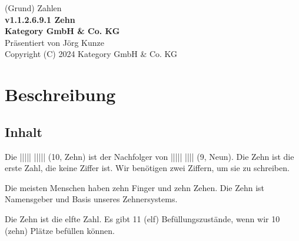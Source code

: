 \documentclass[a4paper]{amsart}
\theoremstyle{definition}
\begin{document}
\begin{titlepage}
\centering
{\huge
(Grund) Zahlen\\[1cm]
\textbf{v1.1.2.6.9.1 Zehn}
}\\[1cm]

\textbf{Kategory GmbH \& Co. KG}\\
Präsentiert von Jörg Kunze\\
Copyright (C) 2024 Kategory GmbH \& Co. KG

\end{titlepage}

%

\newpage

\section*{Beschreibung}

\subsection*{Inhalt}
Die ||||| ||||| (10, Zehn) ist der Nachfolger von ||||| |||| (9, Neun). Die Zehn ist die erste Zahl, die keine Ziffer ist. Wir benötigen zwei Ziffern, um sie zu schreiben.

Die meisten Menschen haben zehn Finger und zehn Zehen. Die Zehn ist Namensgeber und Basis unseres Zehnersystems. 

Die Zehn ist die elfte Zahl. Es gibt 11 (elf) Befüllungszustände, wenn wir 10 (zehn) Plätze befüllen können.
\end{document}
